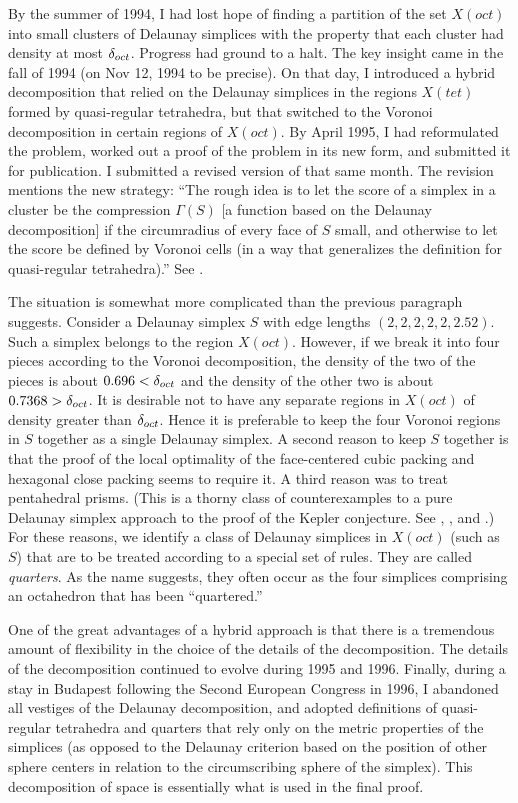 By the summer of 1994, I had lost hope of finding a partition of the
set $X(oct)$ into small clusters of Delaunay simplices with the
property that each cluster had density at most $\delta_{oct}$. Progress had
ground to a halt.   The key insight came in the fall of 1994 (on Nov
12, 1994 to be precise). On that day, I introduced a hybrid
decomposition that relied on the Delaunay simplices in the regions
$X(tet)$ formed by quasi-regular tetrahedra, but that switched to
the Voronoi decomposition in certain regions of $X(oct)$. By April
1995, I had reformulated the problem, worked out a proof of the
problem \cite{Hal97B} in its new form, and submitted it for
publication. I submitted a revised version of \cite{Hal97A} that
same month.  The revision mentions the new strategy: ``The rough
idea is to let the score of a simplex in a cluster be the
compression $\Gamma(S)$ [a function based on the Delaunay
decomposition] if the circumradius of every face of $S$ small, and
otherwise to let the score be defined by Voronoi cells (in a way
that generalizes the definition for quasi-regular tetrahedra).'' See
\cite[p.6]{Hal97A}.

The situation is somewhat more complicated than the previous
paragraph suggests. Consider a Delaunay simplex $S$ with edge
lengths $(2,2,2,2,2,2.52)$. Such a simplex belongs to the region
$X(oct)$. However, if we break it into four pieces according to the
Voronoi decomposition, the density of the two of the pieces is about
$0.696<\delta_{oct}$ and the density of the other two is about
$0.7368>\delta_{oct}$. It is desirable not to have any separate regions in
$X(oct)$ of density greater than $\delta_{oct}$.  Hence it is preferable to
keep the four Voronoi regions in $S$ together as a single Delaunay
simplex.  A second reason to keep $S$ together is that the proof of
the local optimality of the face-centered cubic packing and
hexagonal close packing seems to require it.  A third reason was to
treat pentahedral prisms.  (This is a thorny class of
counterexamples to a pure Delaunay simplex approach to the proof of
the Kepler conjecture.  See \cite{Hal92}, \cite{Hal93}, and
\cite{Fer97}.)  For these reasons, we identify a class of Delaunay
simplices in $X(oct)$ (such as $S$) that are to be treated according
to a special set of rules. They are called {\it quarters}.  As the
name suggests, they often occur as the four simplices comprising an
octahedron that has been ``quartered.''

One of the great advantages of a hybrid approach is that there is
a tremendous amount of flexibility in the choice of the details of
the decomposition.  The details of the decomposition continued to
evolve during 1995 and 1996.  Finally, during a stay in Budapest
following the Second European Congress in 1996, I abandoned all
vestiges of the Delaunay decomposition, and adopted definitions of
quasi-regular tetrahedra and quarters that rely only on the metric
properties of the simplices (as opposed to the Delaunay criterion
based on the position of other sphere centers in relation to the
circumscribing sphere of the simplex).  This decomposition of
space is essentially what is used in the final proof.

